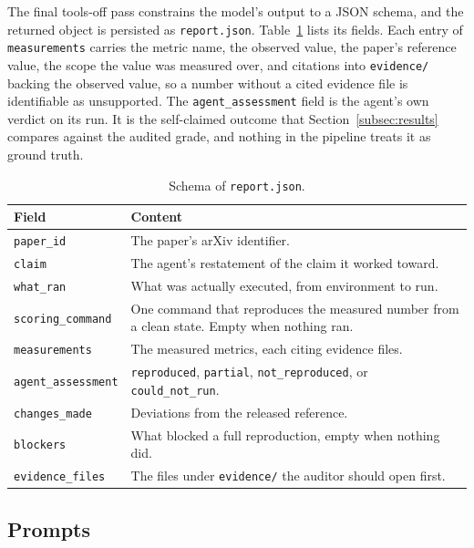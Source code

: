 \documentclass{article} %
\begin{document}
The final tools-off pass constrains the model's output to a JSON schema, and
the returned object is persisted as \texttt{report.json}.
Table~\ref{tab:report-schema} lists its fields. Each entry of
\texttt{measurements} carries the metric name, the observed value, the
paper's reference value, the scope the value was measured over, and
citations into \texttt{evidence/} backing the observed value, so a number
without a cited evidence file is identifiable as unsupported.
The \texttt{agent\_assessment} field is the agent's own verdict on its run.
It is the self-claimed outcome that Section~\ref{subsec:results} compares
against the audited grade, and nothing in the pipeline treats it as ground
truth.

\begin{table}[h]
\caption{Schema of \texttt{report.json}.}
\label{tab:report-schema}
\begin{center}
\small
\begin{tabular}{@{}lp{9.2cm}@{}}
\toprule
Field & Content \\
\midrule
\texttt{paper\_id} & The paper's arXiv identifier. \\
\texttt{claim} & The agent's restatement of the claim it worked toward. \\
\texttt{what\_ran} & What was actually executed, from environment to run. \\
\texttt{scoring\_command} & One command that reproduces the measured number
from a clean state. Empty when nothing ran. \\
\texttt{measurements} & The measured metrics, each citing evidence files. \\
\texttt{agent\_assessment} & \texttt{reproduced}, \texttt{partial},
\texttt{not\_reproduced}, or \texttt{could\_not\_run}. \\
\texttt{changes\_made} & Deviations from the released reference. \\
\texttt{blockers} & What blocked a full reproduction, empty when nothing
did. \\
\texttt{evidence\_files} & The files under \texttt{evidence/} the auditor
should open first. \\
\bottomrule
\end{tabular}
\end{center}
\end{table}

\subsection{Prompts}
\label{app:prompts}
\end{document}
